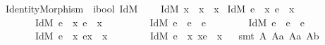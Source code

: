 \begin{isabellebody}
\endisatagproof
{\isafoldproof}%
%
\isadelimproof
%
\endisadelimproof
\isanewline
\isanewline
\isanewline
{}\isamarkupfalse%
\ IdentityMorphism\ {\isacharcolon}{\isacharcolon}\ {\isachardoublequoteopen}i{\isasymRightarrow}bool{\isachardoublequoteclose}\ {\isacharparenleft}{\isachardoublequoteopen}IdM{\isacharunderscore}{\isachardoublequoteclose}\ {\isacharbrackleft}{}{}{}{\isacharbrackright}{}{}{\isacharparenright}\ \isanewline
\ \ {\isachardoublequoteopen}IdM\ x\ {\isasymequiv}\ x\ {\isasymapprox}\ {\isacharparenleft}{\isasymbox}x{\isacharparenright}{\isachardoublequoteclose}\isanewline
\isanewline
{}\isamarkupfalse%
\ {\isachardoublequoteopen}{\isacharparenleft}IdM\ e\ \isactrlbold {\isasymleftrightarrow}\ {\isacharparenleft}\isactrlbold {\isasymexists}x{\isachardot}\ e\ {\isasymapprox}\ {\isacharparenleft}{\isasymbox}x{\isacharparenright}{\isacharparenright}{\isacharparenright}\ \isactrlbold {\isasymand}\isanewline
\ \ \ \ \ \ \ {\isacharparenleft}IdM\ e\ \isactrlbold {\isasymleftrightarrow}\ {\isacharparenleft}\isactrlbold {\isasymexists}x{\isachardot}\ e\ {\isasymapprox}\ {\isacharparenleft}x{\isasymbox}{\isacharparenright}{\isacharparenright}{\isacharparenright}\ \isactrlbold {\isasymand}\ \isanewline
\ \ \ \ \ \ \ {\isacharparenleft}IdM\ e\ \isactrlbold {\isasymleftrightarrow}\ e\ {\isasymapprox}\ {\isacharparenleft}{\isasymbox}e{\isacharparenright}{\isacharparenright}\ \isactrlbold {\isasymand}\isanewline
\ \ \ \ \ \ \ {\isacharparenleft}IdM\ e\ \isactrlbold {\isasymleftrightarrow}\ e\ {\isasymapprox}\ {\isacharparenleft}e{\isasymbox}{\isacharparenright}{\isacharparenright}\ \isactrlbold {\isasymand}\isanewline
\ \ \ \ \ \ \ {\isacharparenleft}IdM\ e\ \isactrlbold {\isasymleftrightarrow}\ {\isacharparenleft}\isactrlbold {\isasymforall}x{\isachardot}\ e{\isasymcdot}x\ {\isasymgreaterapprox}\ x{\isacharparenright}{\isacharparenright}\ \isactrlbold {\isasymand}\isanewline
\ \ \ \ \ \ \ {\isacharparenleft}IdM\ e\ \isactrlbold {\isasymleftrightarrow}\ {\isacharparenleft}\isactrlbold {\isasymforall}x{\isachardot}\ x{\isasymcdot}e\ {\isasymgreaterapprox}\ x{\isacharparenright}{\isacharparenright}{\isachardoublequoteclose}\isanewline
%
\isadelimproof
\ %
\endisadelimproof
%
\isatagproof
{}\isamarkupfalse%
\ {\isacharparenleft}smt\ A{}\ A{}a\ A{}a\ A{}b{\isacharparenright}%
\endisatagproof
{\isafoldproof}%
%
\isadelimproof
\isanewline
%
\endisadelimproof
%
\isadelimtheory
%
\endisadelimtheory
%
\isatagtheory
{}\isamarkupfalse%
%
\endisatagtheory
{\isafoldtheory}%
%
\isadelimtheory
%
\endisadelimtheory
\end{isabellebody}%
